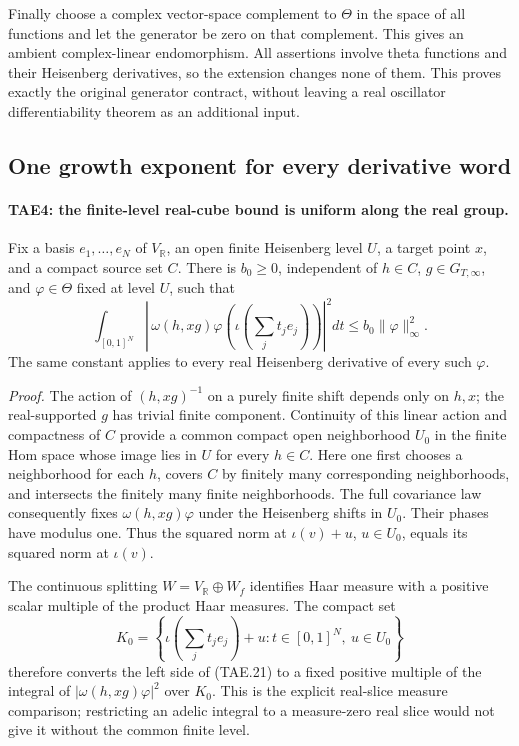 Finally choose a complex vector-space complement to \(\Theta\)
in the space of all functions and let the generator be zero
on that complement.  This gives an ambient complex-linear
endomorphism.  All assertions involve theta functions and
their Heisenberg derivatives, so the extension changes none
of them.  This proves exactly the original generator
contract, without leaving a real oscillator differentiability
theorem as an additional input.

\subsection*{One growth exponent for every derivative word}

\paragraph{TAE4: the finite-level real-cube bound is uniform along the real group.}
\label{claim:TAE4}
Fix a basis \(e_1,\ldots,e_N\) of \(V_{\mathbb R}\), an open
finite Heisenberg level \(U\), a target point \(x\), and a compact
source set \(C\).  There is \(b_0\ge0\), independent of
\(h\in C\), \(g\in G_{T,\infty}\), and \(\varphi\in\Theta\)
fixed at level \(U\), such that
\[
 \int_{[0,1]^N}
   \left|\,\omega(h,xg)\varphi
          \left(\iota\left(\sum_j t_je_j\right)\right)\right|^2dt
             \le b_0\|\varphi\|_\infty^2.
 \tag{TAE.21}
\]
The same constant applies to every real Heisenberg derivative
of every such \(\varphi\).

\emph{Proof.}
The action of \((h,xg)^{-1}\) on a purely finite shift depends
only on \(h,x\); the real-supported \(g\) has trivial finite
component.  Continuity of this linear action and compactness
of \(C\) provide a common compact open neighborhood
\(U_0\) in the finite Hom space whose image lies in \(U\) for
every \(h\in C\).  Here one first chooses a neighborhood for
each \(h\), covers \(C\) by finitely many corresponding
neighborhoods, and intersects the finitely many finite
neighborhoods.  The full covariance law consequently fixes
\(\omega(h,xg)\varphi\) under the Heisenberg shifts in \(U_0\).
Their phases have modulus one.  Thus the squared norm at
\(\iota(v)+u\), \(u\in U_0\), equals its squared norm at
\(\iota(v)\).

The continuous splitting \(W=V_{\mathbb R}\oplus W_f\)
identifies Haar measure with a positive scalar multiple of
the product Haar measures.  The compact set
\[
 K_0=\left\{\iota\left(\sum_jt_je_j\right)+u:
                         t\in[0,1]^N,\ u\in U_0\right\}
 \tag{TAE.22}
\]
therefore converts the left side of (TAE.21) to a fixed
positive multiple of the integral of
\(|\omega(h,xg)\varphi|^2\) over \(K_0\).
This is the explicit real-slice measure comparison; restricting
an adelic integral to a measure-zero real slice would not give
it without the common finite level.

